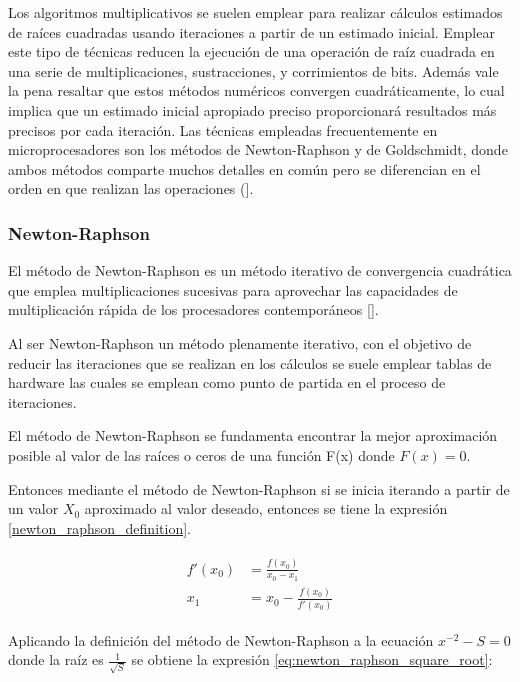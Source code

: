 Los algoritmos multiplicativos se suelen emplear para realizar cálculos estimados de raíces cuadradas usando iteraciones a partir de un estimado inicial. Emplear este tipo de técnicas reducen la ejecución de una operación de raíz cuadrada en una serie de multiplicaciones, sustracciones, y corrimientos de bits. Además vale la pena resaltar que estos métodos numéricos convergen cuadráticamente, lo cual implica que un estimado inicial apropiado preciso proporcionará resultados más precisos por cada iteración. Las técnicas empleadas frecuentemente en microprocesadores son los métodos de Newton-Raphson y de Goldschmidt, donde ambos métodos comparte muchos detalles en común pero se diferencian en el orden en que realizan las operaciones (\cite{Soderquist1997}].

\subsubsection{Newton-Raphson}

El método de Newton-Raphson es un método iterativo de convergencia cuadrática que emplea multiplicaciones sucesivas para aprovechar las capacidades de multiplicación rápida de los procesadores contemporáneos [\cite{Schulte1999}]. 

Al ser Newton-Raphson un método plenamente iterativo, con el objetivo de reducir las iteraciones que se realizan en los cálculos se suele emplear tablas de hardware las cuales se emplean como punto de partida en el proceso de iteraciones.

El método de Newton-Raphson se fundamenta encontrar la mejor aproximación posible al valor de las raíces o ceros de una función F(x) donde $F(x)=0$. 

Entonces mediante el método de Newton-Raphson si se inicia iterando a partir de un valor $X_0$ aproximado al valor deseado, entonces se tiene la expresión \ref{newton_raphson_definition}.


\begin{align} \label{newton_raphson_definition}
\begin{split}
  f'(x_0) &= \frac{f(x_0)}{x_0-x_1} 
\\
  x_1 &= x_0-\frac{f(x_0)}{f'(x_0)} 
\end{split}  
\end{align} 


Aplicando la definición del método de Newton-Raphson a la ecuación $x^{-2}-S=0$ donde la raíz es $\frac{1}{\sqrt{S}}$ se obtiene la expresión \eqref{eq:newton_raphson_square_root}:

